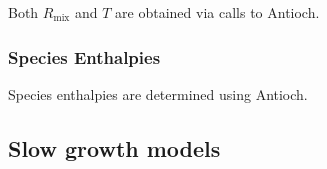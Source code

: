 Both $R_{\mathrm{mix}}$ and $T$ are obtained via calls to Antioch.

\subsubsection{Species Enthalpies}
Species enthalpies are determined using Antioch.


\subsection{Slow growth models}
\label{sec:slowgrowthmodels}






